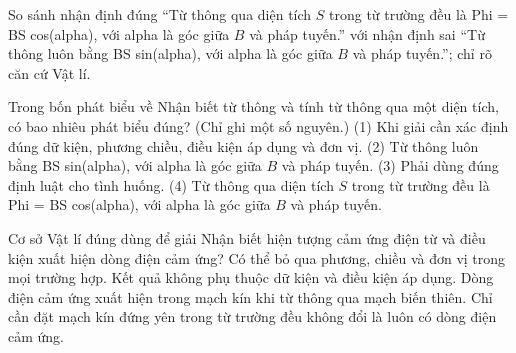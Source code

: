 \begin{bt}
So sánh nhận định đúng “Từ thông qua diện tích $S$ trong từ trường đều là Phi = BS cos(alpha), với alpha là góc giữa $B$ và pháp tuyến.” với nhận định sai “Từ thông luôn bằng BS sin(alpha), với alpha là góc giữa $B$ và pháp tuyến.”; chỉ rõ căn cứ Vật lí.
\end{bt}

\begin{ex}
Trong bốn phát biểu về Nhận biết từ thông và tính từ thông qua một diện tích, có bao nhiêu phát biểu đúng? (Chỉ ghi một số nguyên.) (1) Khi giải cần xác định đúng dữ kiện, phương chiều, điều kiện áp dụng và đơn vị. (2) Từ thông luôn bằng BS sin(alpha), với alpha là góc giữa $B$ và pháp tuyến. (3) Phải dùng đúng định luật cho tình huống. (4) Từ thông qua diện tích $S$ trong từ trường đều là Phi = BS cos(alpha), với alpha là góc giữa $B$ và pháp tuyến.
\end{ex}

\begin{ex}
Cơ sở Vật lí đúng dùng để giải Nhận biết hiện tượng cảm ứng điện từ và điều kiện xuất hiện dòng điện cảm ứng?
\choice
{Có thể bỏ qua phương, chiều và đơn vị trong mọi trường hợp.}
{Kết quả không phụ thuộc dữ kiện và điều kiện áp dụng.}
{\True Dòng điện cảm ứng xuất hiện trong mạch kín khi từ thông qua mạch biến thiên.}
{Chỉ cần đặt mạch kín đứng yên trong từ trường đều không đổi là luôn có dòng điện cảm ứng.}
\end{ex}

